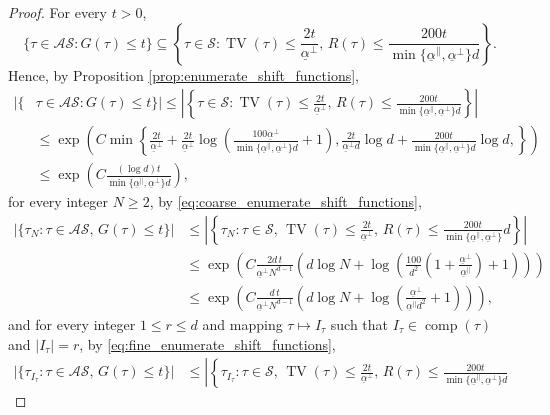 \documentclass[11pt, reqno]{amsart}
\DeclareMathOperator{\TV}{TV}
\DeclareMathOperator{\comp}{comp}
\numberwithin{equation}{section}
\begin{document}
\begin{proof}
For every $t>0$, 
$$
\{\tau\in\mathcal{AS}\colon G(\tau) \leq t\}\subseteq\left\{\tau\in{\mathcal S}\colon \TV(\tau) \leq \frac{2t}{\underline{\alpha}^{\perp}},\, R(\tau) \leq \frac{200t}{\min \{ \underline{\alpha}^{\parallel}, \underline{\alpha}^{\perp}\} d}\right\}.
$$
Hence, by Proposition \ref{prop:enumerate_shift_functions},
\begin{align*}
\lvert\{&\tau\in\mathcal{AS}\colon G(\tau)\leq t\}\rvert \leq\left\lvert\left\{\tau\in{\mathcal S}\colon \TV(\tau) \leq \frac{2t}{\underline{\alpha}^{\perp}},\, R(\tau) \leq \frac{200t}{\min \{\underline{\alpha}^{\parallel},\underline{\alpha}^{\perp}\} d}\right\}\right\rvert\\
&\leq\exp\left(C\min\left\{\frac{2t}{\underline{\alpha}^{\perp}}+\frac{2t}{\underline{\alpha}^{\perp}}\log\left(\frac{100 \underline{\alpha}^{\perp}}{\min \{\underline{\alpha}^{\parallel},\underline{\alpha}^{\perp}\}d}+1\right),
\frac{2t}{\underline{\alpha}^{\perp}d}\log{d}+ \frac{200t}{\min \{\underline{\alpha}^{\parallel},\underline{\alpha}^{\perp}\}d} \log d,
\right\}\right)\\
&\leq\exp\left(C\frac{(\log d)t}{\min \{\underline{\alpha}^{\parallel},\underline{\alpha}^{\perp}\} d}\right),
\end{align*}
for every integer $N\geq 2$, by \eqref{eq:coarse_enumerate_shift_functions},
\begin{align*}
\lvert\{\tau_N\colon\tau\in\mathcal{AS},\, G(\tau)\leq t\}\rvert &\leq\left\lvert\left\{\tau_N\colon \tau\in{\mathcal S},\, \TV(\tau) \leq \frac{2t}{\underline{\alpha}^{\perp}},\, R(\tau) \leq \frac{200t}{\min \{ \underline{\alpha}^{\parallel}, \underline{\alpha}^{\perp}\}} d\right\}\right\rvert\\
&\leq\exp\left(C\frac{2d\,t}{\underline{\alpha}^{\perp} N^{d-1}}  \left(d\log N +\log\left(\frac{100}{d^2}\left(1+\frac{\underline{\alpha}^{\perp}}{\underline{\alpha}^{\parallel}} \right)+1 \right)\right)\right) \\
&\leq\exp\left(C \frac{d\,t}{\underline{\alpha}^{\perp} N^{d-1}}  \left(d\log N +\log\left(\frac{\underline{\alpha}^{\perp}}{\underline{\alpha}^{\parallel}d^2}+1 \right)\right)\right),
\end{align*}
and for every integer $1\le r\le d$ and mapping $\tau \mapsto I_{\tau}$ such that $I_{\tau}\in \comp(\tau)$ and $|I_{\tau}|=r$, by \eqref{eq:fine_enumerate_shift_functions},
\begin{align*}
\lvert\{\tau_{I_{\tau}}\colon\tau\in\mathcal{AS},\, G(\tau)\leq t\}\rvert &\leq\left\lvert\left\{\tau_{I_{\tau}}\colon \tau\in{\mathcal S},\, \TV(\tau) \leq \frac{2t}{\underline{\alpha}^{\perp}},\, R(\tau) \leq \frac{200t}{\min \{ \underline{\alpha}^{\parallel}, \underline{\alpha}^{\perp}\}d}

\end{align*}
\end{proof}
\end{document}
